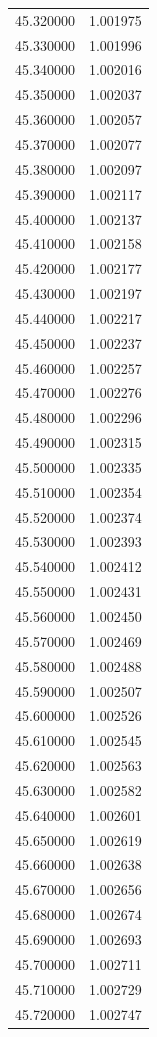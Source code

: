 \begin{tabular}{rr}
45.320000 & 1.001975 \\
45.330000 & 1.001996 \\
45.340000 & 1.002016 \\
45.350000 & 1.002037 \\
45.360000 & 1.002057 \\
45.370000 & 1.002077 \\
45.380000 & 1.002097 \\
45.390000 & 1.002117 \\
45.400000 & 1.002137 \\
45.410000 & 1.002158 \\
45.420000 & 1.002177 \\
45.430000 & 1.002197 \\
45.440000 & 1.002217 \\
45.450000 & 1.002237 \\
45.460000 & 1.002257 \\
45.470000 & 1.002276 \\
45.480000 & 1.002296 \\
45.490000 & 1.002315 \\
45.500000 & 1.002335 \\
45.510000 & 1.002354 \\
45.520000 & 1.002374 \\
45.530000 & 1.002393 \\
45.540000 & 1.002412 \\
45.550000 & 1.002431 \\
45.560000 & 1.002450 \\
45.570000 & 1.002469 \\
45.580000 & 1.002488 \\
45.590000 & 1.002507 \\
45.600000 & 1.002526 \\
45.610000 & 1.002545 \\
45.620000 & 1.002563 \\
45.630000 & 1.002582 \\
45.640000 & 1.002601 \\
45.650000 & 1.002619 \\
45.660000 & 1.002638 \\
45.670000 & 1.002656 \\
45.680000 & 1.002674 \\
45.690000 & 1.002693 \\
45.700000 & 1.002711 \\
45.710000 & 1.002729 \\
45.720000 & 1.002747 \\

\end{tabular}
